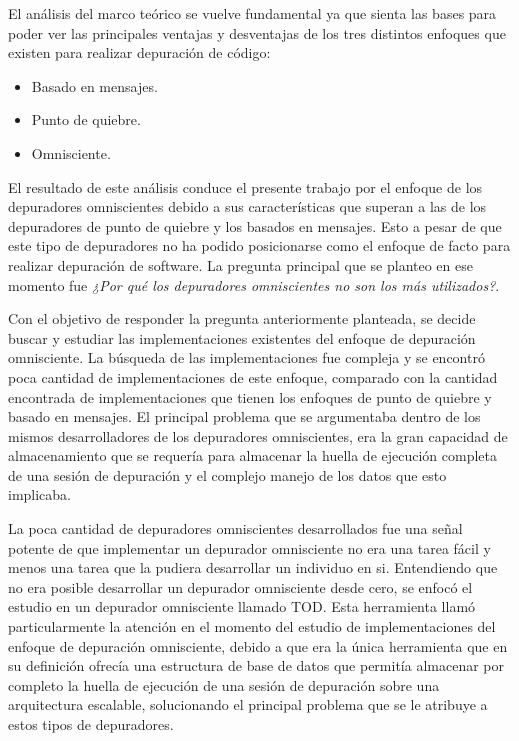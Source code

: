 \documentclass[12pt,legalpaper]{report}
\begin{document}
El análisis del marco teórico se vuelve fundamental ya que sienta las bases para poder ver las principales ventajas y desventajas de los tres distintos enfoques que existen para realizar depuración de código:
\begin{itemize}
	\item Basado en mensajes.
	\item Punto de quiebre.
	\item Omnisciente.
\end{itemize}


El resultado de este análisis conduce el presente trabajo por el enfoque de los depuradores omniscientes debido a sus características que superan a las de los depuradores de punto de quiebre y los basados en mensajes.  Esto a pesar de que este tipo de depuradores no ha podido posicionarse como el enfoque de facto para realizar depuración de software.  La pregunta principal que se planteo en ese momento fue \textit{¿Por qué los depuradores omniscientes no son los más utilizados?}.  

Con el objetivo de responder la pregunta anteriormente planteada, se decide buscar y estudiar las implementaciones existentes del enfoque de depuración omnisciente.  La búsqueda de las implementaciones fue compleja y se encontró poca cantidad de implementaciones de este enfoque, comparado con la cantidad encontrada de implementaciones que tienen los enfoques de punto de quiebre y basado en mensajes.  El principal problema que se argumentaba dentro de los mismos desarrolladores de los depuradores omniscientes, era la gran capacidad de almacenamiento que se requería para almacenar la huella de ejecución completa de una sesión de depuración y el complejo manejo de los datos que esto implicaba. 

La poca cantidad de depuradores omniscientes desarrollados fue una señal potente de que implementar un depurador omnisciente no era una tarea fácil y menos una tarea que la pudiera desarrollar un individuo en si.  Entendiendo que no era posible desarrollar un depurador omnisciente desde cero, se enfocó el estudio en un depurador omnisciente llamado TOD.  Esta herramienta llamó particularmente la atención en el momento del estudio de implementaciones del enfoque de depuración omnisciente, debido a que era la única herramienta que en su definición ofrecía una estructura de base de datos que permitía almacenar por completo la huella de ejecución de una sesión de depuración sobre una arquitectura escalable, solucionando el principal problema que se le atribuye a estos tipos de depuradores.
\end{document}
